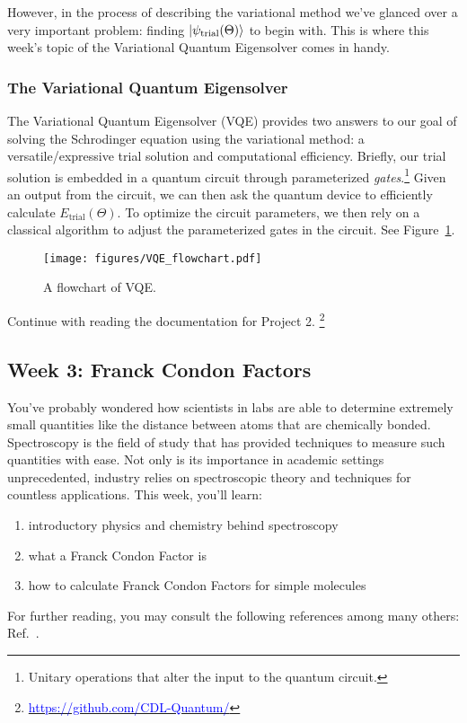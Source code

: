 \documentclass[12pt]{article}
\begin{document}
However, in the process of describing the variational method we've glanced over a very important problem: finding $\ket{\psi_{\text{trial}}(\Theta)}$ to begin with. This is where this week's topic of the Variational Quantum Eigensolver comes in handy.

\subsubsection{The Variational Quantum Eigensolver \cite{PeruzzoVQE}}

The Variational Quantum Eigensolver (VQE) provides two answers to our goal of solving the Schrodinger equation using the variational method: a versatile/expressive trial solution and computational efficiency.
Briefly, our trial solution is embedded in a quantum circuit through parameterized {\it gates}.\footnote{Unitary operations that alter the input to the quantum circuit.} Given an output from the circuit, we can then ask the quantum device to efficiently calculate $E_{\text{trial}}(\Theta)$. To optimize the circuit parameters, we then rely on a classical algorithm to adjust the parameterized gates in the circuit. See Figure~\ref{fig:vqe}.
\begin{figure} \label{fig:vqe}
    \begin{center}
        \texttt{[image: figures/VQE\_flowchart.pdf]}
    \end{center}
    \caption{A flowchart of VQE.}
\end{figure}
Continue with reading the documentation for Project 2.
\footnote{\href{https://github.com/CDL-Quantum/CohortProject_2020/tree/master/Project_2_VQE_Molecules}
    {\textcolor{blue}{https://github.com/CDL-Quantum/}}}

\newpage

\subsection{Week 3: Franck Condon Factors}

You've probably wondered how scientists in labs are able to determine extremely small quantities like the distance between atoms that are chemically bonded.
Spectroscopy is the field of study that has provided techniques to measure such quantities with ease. Not only is its importance in academic settings unprecedented, industry relies on spectroscopic theory and techniques for countless applications. This week, you'll learn:
\begin{enumerate}
    \item introductory physics and chemistry behind spectroscopy
    \item what a Franck Condon Factor is
    \item how to calculate Franck Condon Factors for simple molecules
\end{enumerate}
For further reading, you may consult the following references among many others: Ref.~\cite{quesadaFranckCondonFactorsCounting2019,wrightFranckCondonFactorsTheir1999,fantzFranckCondonFactors2006}.
\end{document}

